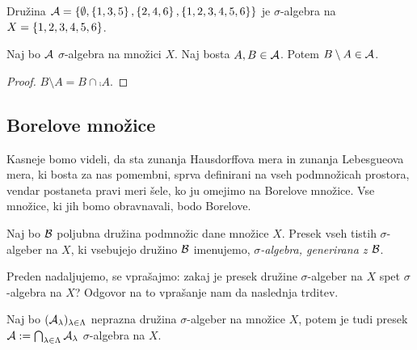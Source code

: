 \begin{zgled}
    Družina \(\mathcal{A} = \left\{\emptyset, \left\{1,3,5\right\}, \left\{2, 4, 6\right\}, \left\{1, 2, 3, 4, 5, 6\right\}\right\}\) je \(\sigma\)-algebra na \(X = \left\{1, 2, 3, 4, 5, 6\right\}\).
\end{zgled}

\begin{trditev}
    \label{set-minus}
    Naj bo \(\mathcal{A}\) \(\sigma\)-algebra na množici \(X\). Naj bosta \(A, B \in \mathcal{A}\). Potem \(B \setminus A \in \mathcal{A}\).
\end{trditev}

\begin{proof}
    \(B \setminus A = B \cap \comp{A}\).
\end{proof}

\subsection{Borelove množice}
Kasneje bomo videli, da sta zunanja Hausdorffova mera in zunanja Lebesgueova mera, ki bosta za nas pomembni, sprva definirani na vseh podmnožicah prostora, vendar postaneta pravi meri šele, ko ju omejimo na Borelove množice. Vse množice, ki jih bomo obravnavali, bodo Borelove.

\begin{definicija}
    Naj bo \(\mathcal{B}\) poljubna družina podmnožic dane množice \(X\). Presek vseh tistih \(\sigma\)-algeber na \(X\), ki vsebujejo družino \(\mathcal{B}\) imenujemo, \emph{\(\sigma\)-algebra, generirana z \(\mathcal{B}\)}.
\end{definicija}

Preden nadaljujemo, se vprašajmo: zakaj je presek družine \(\sigma\)-algeber na \(X\) spet \(\sigma\)-algebra na \(X\)? Odgovor na to vprašanje nam da naslednja trditev.
\begin{trditev}
    Naj bo \((\mathcal{A}_\lambda)_{\lambda \in \Lambda}\) neprazna družina \(\sigma\)-algeber na množice \(X\), potem je tudi presek \(\mathcal{A} := \bigcap_{\lambda \in \Lambda} \mathcal{A}_\lambda\) \(\sigma\)-algebra na \(X\).
\end{trditev}


